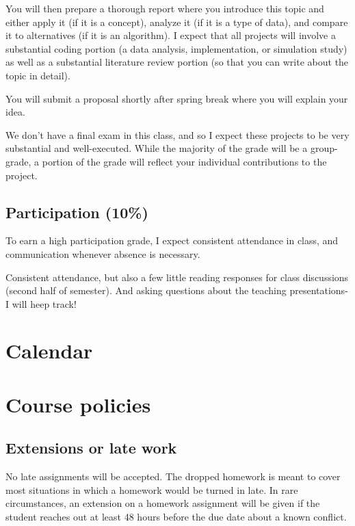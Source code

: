 \documentclass[11pt]{article}
\begin{document}
You will then prepare a thorough report where you introduce this topic and either apply it (if it is a concept), analyze it (if it is a type of data), and compare it to alternatives (if it is an algorithm). I expect that all projects will involve a substantial coding portion (a data analysis, implementation, or simulation study) as well as a substantial literature review portion (so that you can write about the topic in detail). 

You will submit a proposal shortly after spring break where you will explain your idea. 

We don't have a final exam in this class, and so I expect these projects to be very substantial and well-executed. While the majority of the grade will be a group-grade, a portion of the grade will reflect your individual contributions to the project. 

\subsection{Participation (10\%)}

To earn a high participation grade, I expect consistent attendance in class, and communication whenever absence is necessary. 


Consistent attendance, but also a few little reading responses for class discussions (second half of semester). And asking questions about the teaching presentations- I will heep track! 

\section{Calendar}

 


\section{Course policies}

\subsection{Extensions or late work}

No late assignments will be accepted. The dropped homework is meant to cover most situations in which a homework would be turned in late. In rare circumstances, an extension on a homework assignment will be given if the student reaches out at least 48 hours before the due date about a known conflict.
\end{document}
